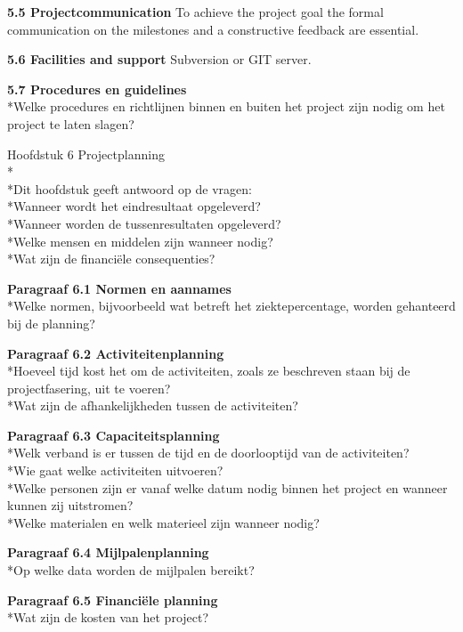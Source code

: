 \documentclass{article}
\begin{document}
\noindent
\textbf{5.5 Projectcommunication}
\newline
To achieve the project goal the formal communication on the milestones and a constructive feedback are essential.
\newline

\noindent
\textbf{5.6 Facilities and support}
\newline
Subversion or GIT server.
\newline

\noindent
\textbf{5.7 Procedures en guidelines}
\\*Welke procedures en richtlijnen binnen en buiten het project zijn nodig om het project te laten slagen?
\newline
\newline

Hoofdstuk 6 Projectplanning
\\*
\\*Dit hoofdstuk geeft antwoord op de vragen:
\\*Wanneer wordt het eindresultaat opgeleverd?
\\*Wanneer worden de tussenresultaten opgeleverd?
\\*Welke mensen en middelen zijn wanneer nodig?
\\*Wat zijn de financiële consequenties?
\newline

\noindent
\textbf{Paragraaf 6.1 Normen en aannames}
\\*Welke normen, bijvoorbeeld wat betreft het ziektepercentage, worden gehanteerd bij de planning?
\newline

\noindent
\textbf{Paragraaf 6.2 Activiteitenplanning}
\\*Hoeveel tijd kost het om de activiteiten, zoals ze beschreven staan bij de projectfasering, uit te voeren?
\\*Wat zijn de afhankelijkheden tussen de activiteiten?
\newline

\noindent
\textbf{Paragraaf 6.3 Capaciteitsplanning}
\\*Welk verband is er tussen de tijd en de doorlooptijd van de activiteiten?
\\*Wie gaat welke activiteiten uitvoeren?
\\*Welke personen zijn er vanaf welke datum nodig binnen het project en wanneer kunnen zij uitstromen?
\\*Welke materialen en welk materieel zijn wanneer nodig?
\newline

\noindent
\textbf{Paragraaf 6.4 Mijlpalenplanning}
\\*Op welke data worden de mijlpalen bereikt?
\newline

\noindent
\textbf{Paragraaf 6.5 Financiële planning}
\\*Wat zijn de kosten van het project?
\end{document}
